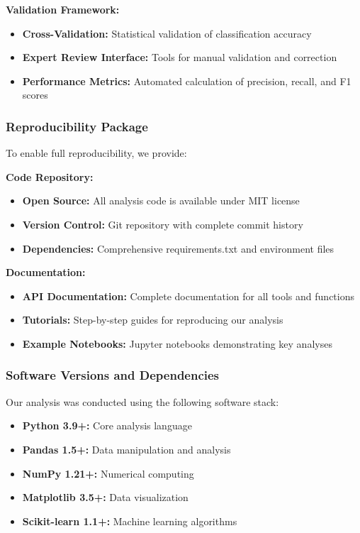 \textbf{Validation Framework:}
\begin{itemize}
    \item \textbf{Cross-Validation:} Statistical validation of classification accuracy
    \item \textbf{Expert Review Interface:} Tools for manual validation and correction
    \item \textbf{Performance Metrics:} Automated calculation of precision, recall, and F1 scores
\end{itemize}

\subsubsection{Reproducibility Package}
To enable full reproducibility, we provide:

\textbf{Code Repository:}
\begin{itemize}
    \item \textbf{Open Source:} All analysis code is available under MIT license
    \item \textbf{Version Control:} Git repository with complete commit history
    \item \textbf{Dependencies:} Comprehensive requirements.txt and environment files
\end{itemize}

\textbf{Documentation:}
\begin{itemize}
    \item \textbf{API Documentation:} Complete documentation for all tools and functions
    \item \textbf{Tutorials:} Step-by-step guides for reproducing our analysis
    \item \textbf{Example Notebooks:} Jupyter notebooks demonstrating key analyses
\end{itemize}

\subsubsection{Software Versions and Dependencies}
Our analysis was conducted using the following software stack:
\begin{itemize}
    \item \textbf{Python 3.9+:} Core analysis language
    \item \textbf{Pandas 1.5+:} Data manipulation and analysis
    \item \textbf{NumPy 1.21+:} Numerical computing
    \item \textbf{Matplotlib 3.5+:} Data visualization
    \item \textbf{Scikit-learn 1.1+:} Machine learning algorithms
\end{itemize}

